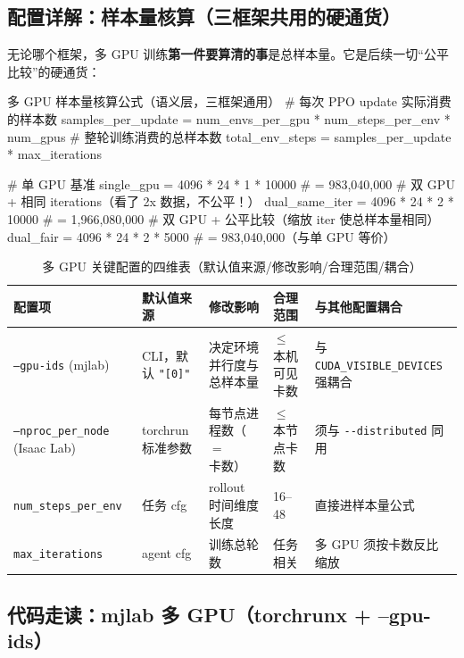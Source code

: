 \subsection{配置详解：样本量核算（三框架共用的硬通货）}
\label{sec:rlmc-ls-sample-ledger}

无论哪个框架，多 GPU 训练\textbf{第一件要算清的事}是总样本量。它是后续一切“公平比较”的硬通货：

\begin{codebox}[Python]{多 GPU 样本量核算公式（语义层，三框架通用）}
# 每次 PPO update 实际消费的样本数
samples_per_update = num_envs_per_gpu * num_steps_per_env * num_gpus
# 整轮训练消费的总样本数
total_env_steps    = samples_per_update * max_iterations

# 单 GPU 基准
single_gpu        = 4096 * 24 * 1 * 10000   # = 983,040,000
# 双 GPU + 相同 iterations（看了 2x 数据，不公平！）
dual_same_iter    = 4096 * 24 * 2 * 10000   # = 1,966,080,000
# 双 GPU + 公平比较（缩放 iter 使总样本量相同）
dual_fair         = 4096 * 24 * 2 * 5000    # = 983,040,000（与单 GPU 等价）
\end{codebox}

\begin{table}[H]\centering\small
\caption{多 GPU 关键配置的四维表（默认值来源/修改影响/合理范围/耦合）}
\label{tab:rlmc-ls-multigpu-cfg}
\begin{tabular}{@{}p{2.4cm}p{2.6cm}p{3.0cm}p{2.2cm}p{2.4cm}@{}}
\toprule
配置项 & 默认值来源 & 修改影响 & 合理范围 & 与其他配置耦合 \\
\midrule
\texttt{--gpu-ids} (mjlab) & CLI，默认 \verb|"[0]"| & 决定环境并行度与总样本量 & $\le$ 本机可见卡数 & 与 \verb|CUDA_VISIBLE_DEVICES| 强耦合 \\
\texttt{--nproc\_per\_node} (Isaac Lab) & torchrun 标准参数 & 每节点进程数（$=$卡数） & $\le$ 本节点卡数 & 须与 \verb|--distributed| 同用 \\
\texttt{num\_steps\_per\_env} & 任务 cfg & rollout 时间维度长度 & 16--48 & 直接进样本量公式 \\
\texttt{max\_iterations} & agent cfg & 训练总轮数 & 任务相关 & 多 GPU 须按卡数反比缩放 \\
\bottomrule
\end{tabular}
\end{table}

\subsection{代码走读：mjlab 多 GPU（torchrunx + --gpu-ids）}
\label{sec:rlmc-ls-mjlab-multigpu}

